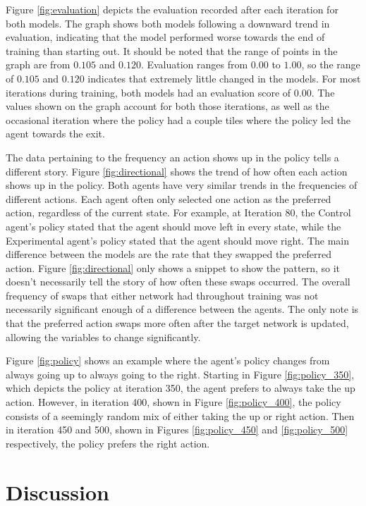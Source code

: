 \documentclass[12pt]{article}
\begin{document}
Figure \ref{fig:evaluation} depicts the evaluation recorded after each iteration for both models.
The graph shows both models following a downward trend in evaluation, indicating that the model performed worse towards the end of training than starting out.
It should be noted that the range of points in the graph are from $0.105$ and $0.120$.
Evaluation ranges from $0.00$ to $1.00$, so the range of $0.105$ and $0.120$ indicates that extremely little changed in the models.
For most iterations during training, both models had an evaluation score of $0.00$.
The values shown on the graph account for both those iterations, as well as the occasional iteration where the policy had a couple tiles where the policy led the agent towards the exit.

The data pertaining to the frequency an action shows up in the policy tells a different story.
Figure \ref{fig:directional} shows the trend of how often each action shows up in the policy.
Both agents have very similar trends in the frequencies of different actions.
Each agent often only selected one action as the preferred action, regardless of the current state.
For example, at Iteration 80, the Control agent's policy stated that the agent should move left in every state, while the Experimental agent's policy stated that the agent should move right.
The main difference between the models are the rate that they swapped the preferred action.
Figure \ref{fig:directional} only shows a snippet to show the pattern, so it doesn't necessarily tell the story of how often these swaps occurred.
The overall frequency of swaps that either network had throughout training was not necessarily significant enough of a difference between the agents.
The only note is that the preferred action swaps more often after the target network is updated, allowing the variables to change significantly.

Figure \ref{fig:policy} shows an example where the agent's policy changes from always going up to always going to the right.
Starting in Figure \ref{fig:policy_350}, which depicts the policy at iteration 350, the agent prefers to always take the up action.
However, in iteration 400, shown in Figure \ref{fig:policy_400}, the policy consists of a seemingly random mix of either taking the up or right action.
Then in iteration 450 and 500, shown in Figures \ref{fig:policy_450} and \ref{fig:policy_500} respectively, the policy prefers the right action.



\section{Discussion}
\end{document}
